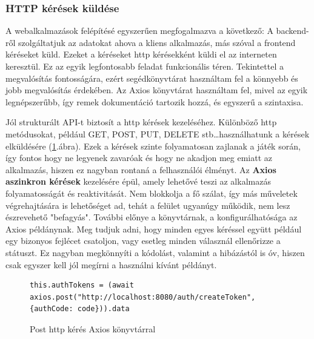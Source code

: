 \documentclass[a4paper,twoside]{article}
\begin{document}
\subsubsection{HTTP kérések küldése}
A webalkalmazások felépítésé egyszerűen megfogalmazva a következő: A backend-ről szolgáltatjuk az adatokat ahova a kliens alkalmazás, más szóval a frontend kéréseket küld. Ezeket a kéréseket http kérésekként küldi el az interneten keresztül. Ez az egyik legfontosabb feladat funkcionális téren. Tekintettel a megvalósítás fontosságára, ezért segédkönyvtárat használtam fel a könnyebb és jobb megvalósítás érdekében. Az Axios\cite{axiosLibrary} könyvtárat használtam fel, mivel az egyik legnépszerűbb, így remek dokumentáció tartozik hozzá, és egyszerű a szintaxisa. 

Jól strukturált API-t biztosít a http kérések kezeléséhez. Különböző http metódusokat, például GET, POST,
PUT, DELETE stb\ldots használhatunk a kérések elküldésére (\ref{axios}.ábra). Ezek a kérések szinte folyamatosan zajlanak a játék során, így fontos hogy ne legyenek zavaróak és hogy ne akadjon meg emiatt az alkalmazás, hiszen ez nagyban rontaná a felhasználói élményt. Az \textbf{Axios aszinkron kérések} kezelésére épül, amely
lehetővé teszi az alkalmazás folyamatosságát és reaktivitását. Nem blokkolja a fő
szálat, így más műveletek végrehajtására is lehetőséget ad, tehát a felület ugyanúgy működik, nem lesz észrevehető "befagyás".
További előnye a könyvtárnak, a konfigurálhatósága az Axios példánynak. Meg tudjuk adni, hogy minden egyes kéréssel együtt például egy bizonyos fejlécet csatoljon, vagy esetleg minden válasznál ellenőrizze a státuszt. Ez nagyban megkönnyíti a kódolást, valamint a hibázástól is óv, hiszen csak egyszer kell jól megírni a használni kívánt példányt. 
\begin{figure}
	\caption{Post http kérés Axios könyvtárral}
	
		\begin{minipage}{\textwidth}
			\begin{lstlisting}[style=javascriptStyle]
					this.authTokens = (await axios.post("http://localhost:8080/auth/createToken", {authCode: code})).data
					\end{lstlisting}
				\end{minipage}
	
\label{axios}
\end{figure}
\end{document}
